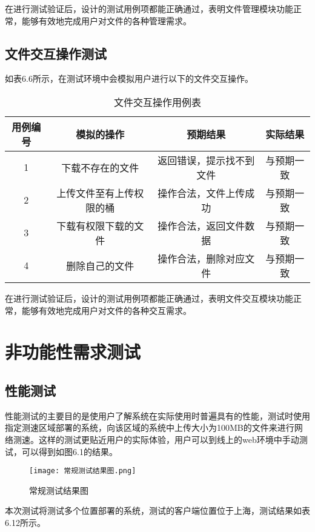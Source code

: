在进行测试验证后，设计的测试用例项都能正确通过，表明文件管理模块功能正常，能够有效地完成用户对文件的各种管理需求。

\subsection{文件交互操作测试}

如表6.6所示，在测试环境中会模拟用户进行以下的文件交互操作。

\begin{table}[h]
  \centering
  \caption{文件交互操作用例表}
  \begin{tabular}{cccc}
    \toprule
    用例编号 & 模拟的操作   & 预期结果 & 实际结果  \\
    \midrule
    1 & 下载不存在的文件          & 返回错误，提示找不到文件  & 与预期一致\\
    2 & 上传文件至有上传权限的桶   & 操作合法，文件上传成功    & 与预期一致\\
    3 & 下载有权限下载的文件       & 操作合法，返回文件数据   & 与预期一致\\
    4 & 删除自己的文件            & 操作合法，删除对应文件   & 与预期一致\\
    \bottomrule
  \end{tabular}
\end{table}

在进行测试验证后，设计的测试用例项都能正确通过，表明文件交互模块功能正常，能够有效地完成用户对文件的各种交互需求。

\section{非功能性需求测试}%

\subsection{性能测试}%
性能测试的主要目的是使用户了解系统在实际使用时普遍具有的性能，测试时使用指定测速区域部署的系统，向该区域的系统中上传大小为100MB的文件来进行网络测速。这样的测试更贴近用户的实际体验，用户可以到线上的web环境中手动测试，可以得到如图6.1的结果。

\begin{figure}
    \centering
    \texttt{[image: 常规测试结果图.png]}
    \caption{常规测试结果图}
\end{figure}

本次测试将测试多个位置部署的系统，测试的客户端位置位于上海，测试结果如表6.12所示。

